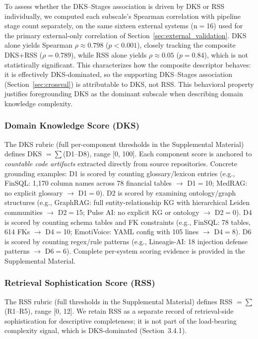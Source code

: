 \documentclass[fleqn,10pt,lineno]{wlpeerj}
\begin{document}
To assess whether the DKS--Stages association is driven by DKS or RSS individually, we computed each subscale's Spearman correlation with pipeline stage count separately, on the same sixteen external systems (n$=$16) used for the primary external-only correlation of Section~\ref{sec:external_validation}. DKS alone yields Spearman $\rho \approx 0.798$ ($p < 0.001$), closely tracking the composite DKS+RSS ($\rho = 0.789$), while RSS alone yields $\rho \approx 0.05$ ($p = 0.84$), which is not statistically significant. This characterizes how the composite descriptor behaves: it is effectively DKS-dominated, so the supporting DKS--Stages association (Section~\ref{sec:crossval}) is attributable to DKS, not RSS. This behavioral property justifies foregrounding DKS as the dominant subscale when describing domain knowledge complexity.

\subsubsection{Domain Knowledge Score (DKS)}

The DKS rubric (full per-component thresholds in the Supplemental Material) defines DKS $= \sum$(D1--D8), range [0, 100]. Each component score is anchored to \textit{countable code artifacts} extracted directly from source repositories. Concrete grounding examples: D1 is scored by counting glossary/lexicon entries (e.g., FinSQL: 1,170 column names across 78 financial tables $\rightarrow$ D1$=$10; MedRAG: no explicit glossary $\rightarrow$ D1$=$0). D2 is scored by examining ontology/graph structures (e.g., GraphRAG: full entity-relationship KG with hierarchical Leiden communities $\rightarrow$ D2$=$15; Pulse AI: no explicit KG or ontology $\rightarrow$ D2$=$0). D4 is scored by counting schema tables and FK constraints (e.g., FinSQL: 78 tables, 614 FKs $\rightarrow$ D4$=$10; EmotiVoice: YAML config with 105 lines $\rightarrow$ D4$=$8). D6 is scored by counting regex/rule patterns (e.g., Lineagis-AI: 18 injection defense patterns $\rightarrow$ D6$=$6). Complete per-system scoring evidence is provided in the Supplemental Material.

\subsubsection{Retrieval Sophistication Score (RSS)}

The RSS rubric (full thresholds in the Supplemental Material) defines RSS $= \sum$(R1--R5), range [0, 12]. We retain RSS as a separate record of retrieval-side sophistication for descriptive completeness; it is not part of the load-bearing complexity signal, which is DKS-dominated (Section~3.4.1).
\end{document}
